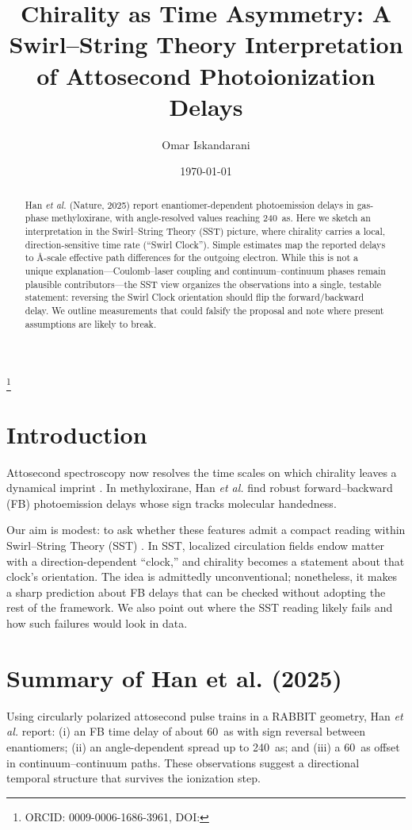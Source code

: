 \documentclass[reprint, aps, prl, longbibliography]{revtex4-2}
\begin{document}
\title{Chirality as Time Asymmetry: A Swirl--String Theory Interpretation of Attosecond Photoionization Delays}
\author{Omar Iskandarani}
\thanks{ORCID: 0009-0006-1686-3961, DOI: \paperdoi}
\date{\today}

\begin{abstract}
Han \emph{et al.} (Nature, 2025) report enantiomer-dependent photoemission delays in gas-phase methyloxirane, with angle-resolved values reaching \SI{240}{\atto\second}. Here we sketch an interpretation in the Swirl--String Theory (SST) picture, where chirality carries a local, direction-sensitive time rate (“Swirl Clock”). Simple estimates map the reported delays to Å-scale effective path differences for the outgoing electron. While this is not a unique explanation—Coulomb–laser coupling and continuum–continuum phases remain plausible contributors—the SST view organizes the observations into a single, testable statement: reversing the Swirl Clock orientation should flip the forward/backward delay. We outline measurements that could falsify the proposal and note where present assumptions are likely to break.
\end{abstract}


\maketitle


\section{Introduction}
Attosecond spectroscopy now resolves the time scales on which chirality leaves a dynamical imprint \cite{Krausz2009,Beaulieu2018}. In methyloxirane, Han \emph{et al.} \cite{Han2025} find robust forward–backward (FB) photoemission delays whose sign tracks molecular handedness.

Our aim is modest: to ask whether these features admit a compact reading within Swirl--String Theory (SST) \cite{IskandaraniSSTCanon}. In SST, localized circulation fields endow matter with a direction-dependent “clock,” and chirality becomes a statement about that clock’s orientation. The idea is admittedly unconventional; nonetheless, it makes a sharp prediction about FB delays that can be checked without adopting the rest of the framework. We also point out where the SST reading likely fails and how such failures would look in data.


\section{Summary of Han et al. (2025)}
Using circularly polarized attosecond pulse trains in a RABBIT geometry, Han \emph{et al.} \cite{Han2025} report:
(i) an FB time delay of about \SI{60}{\atto\second} with sign reversal between enantiomers;
(ii) an angle-dependent spread up to \SI{240}{\atto\second}; and
(iii) a \SI{60}{\atto\second} offset in continuum–continuum paths.
These observations suggest a directional temporal structure that survives the ionization step.
\end{document}
